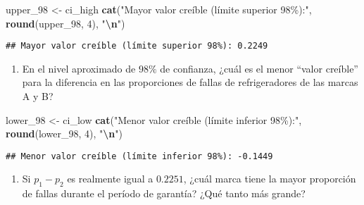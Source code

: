 \documentclass[
]{article}
\newenvironment{Shaded}{\begin{snugshade}}{\end{snugshade}}
\newcommand{\DecValTok}[1]{\textcolor[rgb]{0.00,0.00,0.81}{#1}}
\newcommand{\FunctionTok}[1]{\textcolor[rgb]{0.13,0.29,0.53}{\textbf{#1}}}
\newcommand{\NormalTok}[1]{#1}
\newcommand{\OtherTok}[1]{\textcolor[rgb]{0.56,0.35,0.01}{#1}}
\newcommand{\SpecialCharTok}[1]{\textcolor[rgb]{0.81,0.36,0.00}{\textbf{#1}}}
\newcommand{\StringTok}[1]{\textcolor[rgb]{0.31,0.60,0.02}{#1}}
\providecommand{\tightlist}{%
  \setlength{\itemsep}{0pt}\setlength{\parskip}{0pt}}
\begin{document}
\begin{Shaded}
\begin{Highlighting}[]
\NormalTok{upper\_98 }\OtherTok{\textless{}{-}}\NormalTok{ ci\_high}
\FunctionTok{cat}\NormalTok{(}\StringTok{"Mayor valor creíble (límite superior 98\%):"}\NormalTok{, }\FunctionTok{round}\NormalTok{(upper\_98, }\DecValTok{4}\NormalTok{), }\StringTok{"}\SpecialCharTok{\textbackslash{}n}\StringTok{"}\NormalTok{)}
\end{Highlighting}
\end{Shaded}

\begin{verbatim}
## Mayor valor creíble (límite superior 98%): 0.2249
\end{verbatim}

\begin{enumerate}
\def\labelenumi{\alph{enumi})}
\setcounter{enumi}{2}
\tightlist
\item
  En el nivel aproximado de \(98 \%\) de confianza, ¿cuál es el menor
  ``valor creíble'' para la diferencia en las proporciones de fallas de
  refrigeradores de las marcas A y B?
\end{enumerate}

\begin{Shaded}
\begin{Highlighting}[]
\NormalTok{lower\_98 }\OtherTok{\textless{}{-}}\NormalTok{ ci\_low}
\FunctionTok{cat}\NormalTok{(}\StringTok{"Menor valor creíble (límite inferior 98\%):"}\NormalTok{, }\FunctionTok{round}\NormalTok{(lower\_98, }\DecValTok{4}\NormalTok{), }\StringTok{"}\SpecialCharTok{\textbackslash{}n}\StringTok{"}\NormalTok{)}
\end{Highlighting}
\end{Shaded}

\begin{verbatim}
## Menor valor creíble (límite inferior 98%): -0.1449
\end{verbatim}

\begin{enumerate}
\def\labelenumi{\alph{enumi})}
\setcounter{enumi}{3}
\tightlist
\item
  Si \(p_1 - p_2\) es realmente igual a \(0.2251\), ¿cuál marca tiene la
  mayor proporción de fallas durante el período de garantía? ¿Qué tanto
  más grande?
\end{enumerate}
\end{document}

